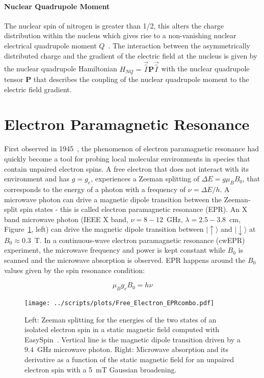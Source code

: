 \paragraph*{Nuclear Quadrupole Moment}
The nuclear spin of nitrogen is greater than 1/2, this alters the charge distribution within the nucleus which gives rise to a non-vanishing nuclear electrical quadrupole moment $Q$~\cite{Schweiger2001}. The interaction between the asymmetrically distributed charge and the gradient of the electric field at the nucleus is given by the nuclear quadrupole Hamiltonian $H_{NQ}=\vec{\hat{I}}\textbf{P}\vec{\hat{I}}$ with the nuclear quadrupole tensor $\textbf{P}$ that describes the coupling of the nuclear quadrupole moment to the electric field gradient.




\section{Electron Paramagnetic Resonance}
\label{subs:cwEPR_spectroscopy}
First observed in 1945~\cite{Zavoisky_1945_JP,zavoisky_1945,salikhov_2015}, the phenomenon of electron paramagnetic resonance had quickly become a tool for probing local molecular environments in species that contain unpaired electron spins. A free electron that does not interact with its environment and has $g=g_e$, experiences a Zeeman splitting of $\Delta E = g \mu_B B_0$, that corresponds to the energy of a photon with a frequency of $\nu=\Delta E / h$. A microwave photon can drive a magnetic dipole transition between the Zeeman-split spin states - this is called electron paramagnetic resonance (EPR). An X band microwave photon (IEEE X band, $\nu=8-12$~GHz, $\lambda=2.5-3.8$~cm, Figure~\ref{fig:cwerp_free_electron}, left) can drive the magnetic dipole transition between $\vert{\uparrow\rangle}$ and $\vert{\downarrow\rangle}$ at $B_0\approx0.3$~T. In a continuous-wave electron paramagnetic resonance (cwEPR) experiment, the microwave frequency and power is kept constant while $B_0$ is scanned and the microwave absorption is observed. EPR happens around the $B_0$ values given by the spin resonance condition:

\begin{equation}
\label{eq:epr_resonance_condition}
\mu_B g_e B_0 = h\nu
\end{equation}

\begin{figure}[h]
\center
	\texttt{[image: ../scripts/plots/Free\_Electron\_EPRcombo.pdf]}
	\caption{Left: Zeeman splitting for the energies of the two states of an isolated electron spin in a static magnetic field computed with EasySpin~\cite{Stoll2006}. Vertical line is the magnetic dipole transition driven by a $9.4$~GHz microwave photon. Right: Microwave absorption and its derivative as a function of the static magnetic field for an unpaired electron spin with a 5~mT Gaussian broadening.}
	\label{fig:cwerp_free_electron}
\end{figure}


